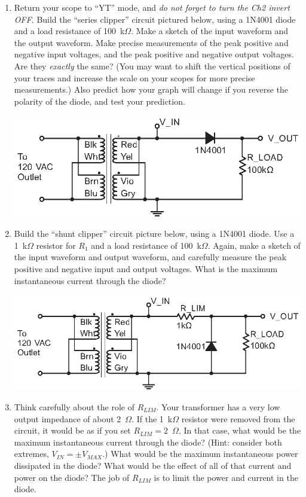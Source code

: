 \begin{enumerate}[wide]
\item Return your scope to ``YT'' mode, and \textit{do not forget to turn the Ch2 invert OFF}.  Build the ``series clipper'' circuit pictured below, using a 1N4001 diode and a load resistance of 100~k$\Omega$.  Make a sketch of the input waveform and the output waveform.  Make precise measurements of the peak positive and negative input voltages, and the peak positive and negative output voltages.  Are they \textit{exactly} the same?  (You may want to shift the vertical positions of your traces and increase the scale on your scopes for more precise measurements.)  Also predict how your graph will change if you reverse the polarity of the diode, and test your prediction. \label{part_series_clipper}
\begin{center}
\includegraphics{diodes/series_clipper.eps}
\end{center}

\item Build the ``shunt clipper'' circuit picture below, using a 1N4001 diode.  Use a 1~k$\Omega$ resistor for $R_1$ and a load resistance of 100~k$\Omega$.  Again, make a sketch of the input waveform and output waveform, and carefully measure the peak positive and negative input and output voltages.  What is the maximum instantaneous current through the diode?  \label{part_shunt_clipper}
\begin{center}
\includegraphics{diodes/shunt_clipper.eps}
\end{center} 
\item Think carefully about the role of $R_{LIM}$.  Your transformer has a very low output impedance of about 2~$\Omega$.  If the 1~k$\Omega$ resistor were removed from the circuit, it would be as if you set $R_{LIM} = 2$~$\Omega$.  In that case, what would be the maximum instantaneous current through the diode?  (Hint: consider both extremes, $V_{IN} = \pm V_{MAX}$.) What would be the maximum instantaneous power dissipated in the diode?  What would be the effect of all of that current and power on the diode?  The job of $R_{LIM}$ is to limit the power and current in the diode.


\end{enumerate}
